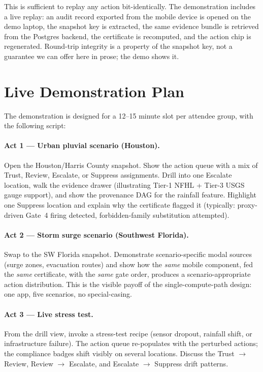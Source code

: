 \documentclass[sigconf,nonacm=true,review,authoryear]{acmart}
\begin{document}
This is sufficient to replay any action bit-identically. The
demonstration includes a live replay: an audit record exported from
the mobile device is opened on the demo laptop, the snapshot key is
extracted, the same evidence bundle is retrieved from the Postgres
backend, the certificate is recomputed, and the action chip is
regenerated. Round-trip integrity is a property of the snapshot key,
not a guarantee we can offer here in prose; the demo shows it.

\section{Live Demonstration Plan}
\label{sec:demo-plan}

The demonstration is designed for a 12--15 minute slot per attendee
group, with the following script:

\paragraph{Act 1 --- Urban pluvial scenario (Houston).}
Open the Houston/Harris County snapshot. Show the action queue with
a mix of Trust, Review, Escalate, or Suppress assignments. Drill into one
Escalate location, walk the evidence drawer (illustrating Tier-1
NFHL + Tier-3 USGS gauge support), and show the provenance DAG for
the rainfall feature. Highlight one Suppress location and explain
why the certificate flagged it (typically: proxy-driven Gate~4
firing detected, forbidden-family substitution attempted).

\paragraph{Act 2 --- Storm surge scenario (Southwest Florida).}
Swap to the SW Florida snapshot. Demonstrate scenario-specific
modal sources (surge zones, evacuation routes) and show how the
\emph{same} mobile component, fed the \emph{same} certificate, with
the \emph{same} gate order, produces a scenario-appropriate action
distribution. This is the visible payoff of the single-compute-path
design: one app, five scenarios, no special-casing.

\paragraph{Act 3 --- Live stress test.}
From the drill view, invoke a stress-test recipe (sensor dropout,
rainfall shift, or infrastructure failure). The action queue
re-populates with the perturbed actions; the compliance badges shift
visibly on several locations. Discuss the
Trust $\to$ Review, Review $\to$ Escalate, and
Escalate $\to$ Suppress drift patterns.
\end{document}

